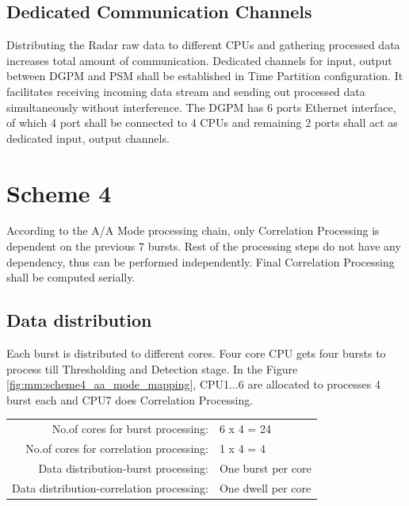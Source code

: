 \subsection{Dedicated Communication Channels}
Distributing the Radar raw data to different CPUs and gathering processed data increases total amount of communication. Dedicated channels for input, output between DGPM and PSM shall be established in Time Partition configuration. It facilitates receiving incoming data stream and sending out processed data simultaneously without interference. The DGPM has 6 ports Ethernet interface, of which 4 port shall be connected to 4 CPUs and remaining 2 ports shall act as dedicated input, output channels.

\section{Scheme 4}
\label{sec:mm:scheme4}
According to the A/A Mode processing chain, only Correlation Processing is dependent on the previous 7 bursts. Rest of the processing steps do not have any dependency, thus can be performed independently. Final Correlation Processing shall be computed serially.

\subsection{Data distribution}
Each burst is distributed to different cores. Four core CPU gets four bursts to process till Thresholding and Detection stage. In the Figure \ref{fig:mm:scheme4_aa_mode_mapping}, CPU1...6 are allocated to processes 4 burst each and CPU7 does Correlation Processing.

\begin{tabular}{rl}
	No.of cores for burst processing: & 6 x 4 = 24 \\
	No.of cores for correlation processing: & 1 x 4 = 4 \\
	Data distribution-burst processing: & One burst per core \\
	Data distribution-correlation processing: & One dwell per core \\
\end{tabular}


